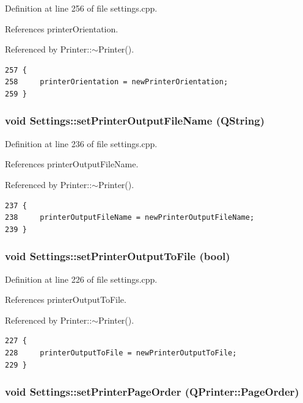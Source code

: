 Definition at line 256 of file settings.cpp.

References printer\-Orientation.

Referenced by Printer::$\sim$Printer().

\footnotesize\begin{verbatim}257 {
258     printerOrientation = newPrinterOrientation;
259 }
\end{verbatim}\normalsize 


\hypertarget{classSettings_a24}{
\subsubsection[setPrinterOutputFileName]{\setlength{\rightskip}{0pt plus 5cm}void Settings::set\-Printer\-Output\-File\-Name (QString)}}
\label{classSettings_a24}


Definition at line 236 of file settings.cpp.

References printer\-Output\-File\-Name.

Referenced by Printer::$\sim$Printer().

\footnotesize\begin{verbatim}237 {
238     printerOutputFileName = newPrinterOutputFileName;
239 }
\end{verbatim}\normalsize 


\hypertarget{classSettings_a22}{
\subsubsection[setPrinterOutputToFile]{\setlength{\rightskip}{0pt plus 5cm}void Settings::set\-Printer\-Output\-To\-File (bool)}}
\label{classSettings_a22}


Definition at line 226 of file settings.cpp.

References printer\-Output\-To\-File.

Referenced by Printer::$\sim$Printer().

\footnotesize\begin{verbatim}227 {
228     printerOutputToFile = newPrinterOutputToFile;
229 }
\end{verbatim}\normalsize 


\hypertarget{classSettings_a32}{
\subsubsection[setPrinterPageOrder]{\setlength{\rightskip}{0pt plus 5cm}void Settings::set\-Printer\-Page\-Order (QPrinter::Page\-Order)}}
\label{classSettings_a32}


